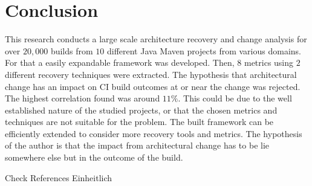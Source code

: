 \documentclass[conference]{IEEEtran}
\begin{document}
\section{Conclusion}

This research conducts a large scale architecture recovery and change analysis for over $20,000$ builds from $10$ different Java Maven projects from various domains. For that a easily expandable framework was developed. Then, $8$ metrics using $2$ different recovery techniques were extracted. The hypothesis that architectural change has an impact on CI build outcomes at or near the change was rejected. The highest correlation found was around $11\%$. This could be due to the well established nature of the studied projects, or that the chosen metrics and techniques are not suitable for the problem. The built framework can be efficiently extended to consider more recovery tools and metrics. The hypothesis of the author is that the impact from architectural change has to be lie somewhere else but in the outcome of the build.

Check References Einheitlich



\end{document}
